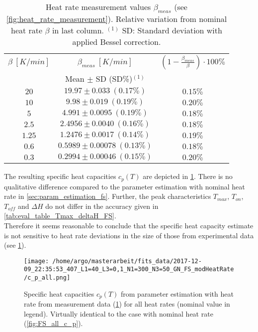\documentclass{scrartcl}[12pt, halfparskip]
\numberwithin{equation}{section}
\numberwithin{figure}{section}
\numberwithin{table}{section}
\begin{document}
\begin{table}[H]
	\centering
	\caption{Heat rate measurement values $\beta_{meas}$ (see \cref{fig:heat_rate_measurement}). Relative variation from nominal heat rate $\beta$ in last column. $^{(1)}$ SD: Standard deviation with applied Bessel correction.}
	\begin{tabular}{| c | c | c |} \hline 
		$\beta \ [K/min]$ & $\beta_{meas} \ [K/min]$ & $\left(1 - \frac{\beta_{meas}}{\beta}\right) \cdot 100\%$  \\ 
		& Mean $\pm$ SD (SD\%)$^{(1)}$ & \\ \hline
		$20$ & $19.97 \pm 0.033 \ (0.17\%)$ & $0.15\%$ \\
		$10$ & $9.98 \pm 0.019 \ (0.19\%)$ & $0.20\%$ \\
		$5$ & $4.991 \pm 0.0095 \ (0.19\%)$ & $0.18\%$ \\
		$2.5$ & $2.4956 \pm 0.0040 \ (0.16\%)$ & $0.18\%$ \\
		$1.25$ & $1.2476 \pm 0.0017 \ (0.14\%)$ & $0.19\%$ \\
		$0.6$ & $0.5989 \pm 0.00078 \ (0.13\%)$ & $0.18\%$ \\
		$0.3$ & $0.2994 \pm 0.00046 \ (0.15\%)$ & $0.20\%$ \\ \hline
	\end{tabular}
	\label{tab:mod_heat_rate}
\end{table}

The resulting specific heat capacities $c_p(T)$ are depicted in \cref{fig:FS_all_c_p_modHeatRate}. There is no qualitative difference compared to the parameter estimation with nominal heat rate in \cref{sec:param_estimation_fs}. Further, the peak characteristics $T_{max}$, $T_{on}$, $T_{off}$ and $\Delta H$ do not differ in the accuracy given in \cref{tab:eval_table_Tmax_deltaH_FS}. \\
Therefore it seems reasonable to conclude that the specific heat capacity estimate is not sensitive to heat rate deviations in the size of those from experimental data (see \cref{tab:mod_heat_rate}).

\begin{figure}[H]
	\centering
	\texttt{[image: /home/argo/masterarbeit/fits\_data/2017-12-09\_22:35:53\_407\_L1=40\_L3=0,1\_N1=300\_N3=50\_GN\_FS\_modHeatRate/c\_p\_all.png]}
	\caption{Specific heat capacities $c_p(T)$ from parameter estimation with heat rate from measurement data (\cref{tab:mod_heat_rate}) for all heat rates (nominal value in legend). Virtually identical to the case with nominal heat rate (\cref{fig:FS_all_c_p}).}
	\label{fig:FS_all_c_p_modHeatRate}
\end{figure}
\end{document}
